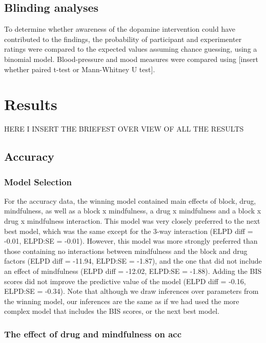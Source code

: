 \documentclass{article}
\begin{document}
\hypertarget{blinding-analyses}{%
\subsection{Blinding analyses}\label{blinding-analyses}}

To determine whether awareness of the dopamine intervention could have
contributed to the findings, the probability of participant and
experimenter ratings were compared to the expected values assuming
chance guessing, using a binomial model. Blood-pressure and mood
measures were compared using {[}insert whether paired t-test or
Mann-Whitney U test{]}.

\hypertarget{results}{%
\section{Results}\label{results}}

HERE I INSERT THE BRIEFEST OVER VIEW OF ALL THE RESULTS

\hypertarget{accuracy-1}{%
\subsection{Accuracy}\label{accuracy-1}}

\hypertarget{model-selection}{%
\subsubsection{Model Selection}\label{model-selection}}

For the accuracy data, the winning model contained main effects of
block, drug, mindfulness, as well as a block x mindfulness, a drug x
mindfulness and a block x drug x mindfulness interaction. This model was
very closely preferred to the next best model, which was the same except
for the 3-way interaction (ELPD diff = -0.01, ELPD:SE = -0.01). However,
this model was more strongly preferred than those containing no
interactions between mindfulness and the block and drug factors (ELPD
diff = -11.94, ELPD:SE = -1.87), and the one that did not include an
effect of mindfulness (ELPD diff = -12.02, ELPD:SE = -1.88). Adding the
BIS scores did not improve the predictive value of the model (ELPD diff
= -0.16, ELPD:SE = -0.34). Note that although we draw inferences over
parameters from the winning model, our inferences are the same as if we
had used the more complex model that includes the BIS scores, or the
next best model.

\hypertarget{the-effect-of-drug-and-mindfulness-on-acc}{%
\subsubsection{The effect of drug and mindfulness on
acc}\label{the-effect-of-drug-and-mindfulness-on-acc}}
\end{document}

